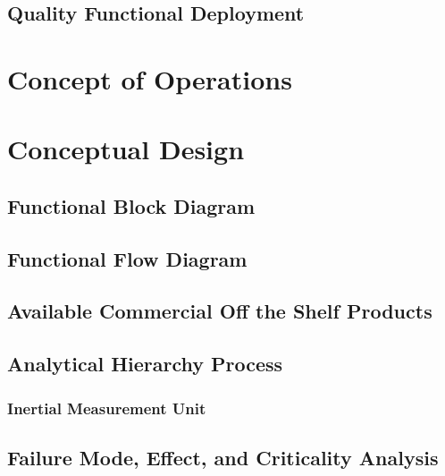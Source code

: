 \begin{landscape}
\end{landscape}

\subsection{Quality Functional Deployment} \label{ssec:qfd}

\section{Concept of Operations} \label{sec:conops}

\section{Conceptual Design} \label{sec:conceptual_design}

\subsection{Functional Block Diagram} \label{ssec:block_diagram}

\subsection{Functional Flow Diagram} \label{ssec:flow_diagram}

\subsection{Available Commercial Off the Shelf Products} \label{ssec:cots_products}

\subsection{Analytical Hierarchy Process} \label{ssec:ahp}

\subsubsection*{Inertial Measurement Unit} \label{sssec:ahp_imu}

\subsection{Failure Mode, Effect, and Criticality Analysis} \label{ssec:fmeca}